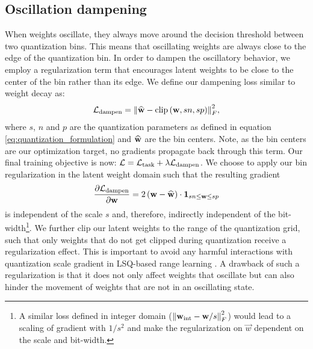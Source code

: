 \subsection{Oscillation dampening}
\label{sec:oscillations_dampening}
When weights oscillate, they always move around the decision threshold between two quantization bins. This means that oscillating weights are always close to the edge of the quantization bin. In order to dampen the oscillatory behavior, we employ a regularization term that encourages latent weights to be close to the center of the bin rather than its edge. We define our dampening loss similar to weight decay as:
\begin{equation}
    \label{eq:loss_dampen}
    \tlossb_{\text{dampen}} = \norm*{\vecq{w} - \clip{\vec{w}}{ s \ct{n}}{s \ct{p}}}^2_F,
\end{equation}
where $s$, $n$ and $p$ are the quantization parameters as defined in equation \eqref{eq:quantization_formulation}
and $\vecq{w}$ are the bin centers. Note, as the bin centers are our optimization target, no gradients propagate back through this term.
Our final training objective is now: $\tlossb = \tlossb_{\text{task}} + \lambda\tlossb_{\text{dampen}}$. We choose to apply our bin regularization in the latent weight domain such that the resulting gradient
\begin{equation}
    \frac{\partial\tlossb_{\text{dampen}}}{\partial \vec{w}} = 2 \l(\vec{w} - \vecq{w} \r ) \cdot  \mathbf{1}_{\ct{s}n \leq \vec{w} \leq \ct{s}p}
\end{equation}
is independent of the scale $s$ and, therefore, indirectly independent of the bit-width\footnote{A similar loss defined in integer domain ($\norm*{\vec{w}_{\INT} - \vec{w}/s}^2_F$) would lead to a scaling of gradient with $1/s^2$ and make the regularization on $\vec{w}$ dependent on the scale and bit-width.}.
We further clip our latent weights to the range of the quantization grid, such that only weights that do not get clipped during quantization receive a regularization effect. This is important to avoid any harmful interactions with quantization scale gradient in LSQ-based range learning \citep{lsq}.  A drawback of such a regularization is that it does not only affect weights that oscillate but can also hinder the movement of weights that are not in an oscillating state.

